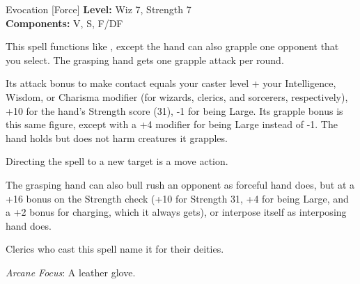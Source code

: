 {Evocation [Force]}
{
	\textbf{Level:}
	Wiz 7, Strength 7\\
	\textbf{Components:}
	V, S, F/DF\\
}
{
	This spell functions like , except the hand can also grapple one opponent that you select. The grasping hand gets one grapple attack per round.

	Its attack bonus to make contact equals your caster level + your Intelligence, Wisdom, or Charisma modifier (for wizards, clerics, and sorcerers, respectively), +10 for the hand's Strength score (31), -1 for being Large. Its grapple bonus is this same figure, except with a +4 modifier for being Large instead of -1. The hand holds but does not harm creatures it grapples.

	Directing the spell to a new target is a move action.

	The grasping hand can also bull rush an opponent as forceful hand does, but at a +16 bonus on the Strength check (+10 for Strength 31, +4 for being Large, and a +2 bonus for charging, which it always gets), or interpose itself as interposing hand does.

Clerics who cast this spell name it for their deities.

	\textit{Arcane Focus}:
	A leather glove.

}
